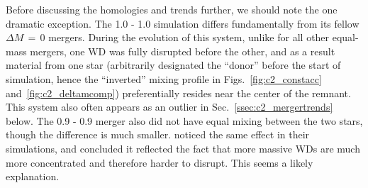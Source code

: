 Before discussing the homologies and trends further, we should note the one dramatic exception.  The 1.0 - 1.0 {\Msun} simulation differs fundamentally from its fellow $\Delta M\,=\,0$ mergers.  During the evolution of this system, unlike for all other equal-mass mergers, one WD was fully disrupted before the other, and as a result material from one star (arbitrarily designated the ``donor'' before the start of simulation, hence the ``inverted'' mixing profile in Figs.~\ref{fig:c2_constacc} and~\ref{fig:c2_deltamcomp}) preferentially resides near the center of the remnant.  This system also often appears as an outlier in Sec.~\ref{ssec:c2_mergertrends} below.  The 0.9 - 0.9 {\Msun} merger also did not have equal mixing between the two stars, though the difference is much smaller.  \cite{rask+12} noticed the same effect in their simulations, and concluded it reflected the fact that more massive WDs are much more concentrated and therefore harder to disrupt.  This seems a likely explanation.




